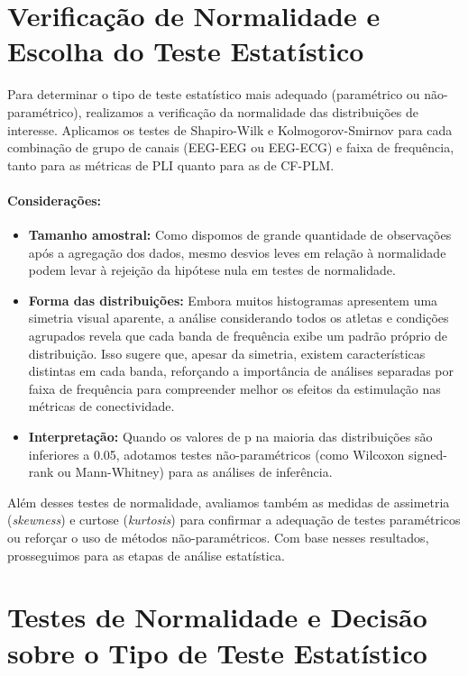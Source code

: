 \section{Verificação de Normalidade e Escolha do Teste Estatístico}

Para determinar o tipo de teste estatístico mais adequado (paramétrico ou não-paramétrico), realizamos a verificação da normalidade das distribuições de interesse. Aplicamos os testes de Shapiro-Wilk e Kolmogorov-Smirnov para cada combinação de grupo de canais (EEG-EEG ou EEG-ECG) e faixa de frequência, tanto para as métricas de PLI quanto para as de CF-PLM.

\paragraph{Considerações:}
\begin{itemize}
    \item \textbf{Tamanho amostral:} Como dispomos de grande quantidade de observações após a agregação dos dados, mesmo desvios leves em relação à normalidade podem levar à rejeição da hipótese nula em testes de normalidade.
    \item \textbf{Forma das distribuições:} Embora muitos histogramas apresentem uma simetria visual aparente, a análise considerando todos os atletas e condições agrupados revela que cada banda de frequência exibe um padrão próprio de distribuição. Isso sugere que, apesar da simetria, existem características distintas em cada banda, reforçando a importância de análises separadas por faixa de frequência para compreender melhor os efeitos da estimulação nas métricas de conectividade.
    \item \textbf{Interpretação:} Quando os valores de p na maioria das distribuições são inferiores a 0.05, adotamos testes não-paramétricos (como Wilcoxon signed-rank ou Mann-Whitney) para as análises de inferência.
\end{itemize}

Além desses testes de normalidade, avaliamos também as medidas de assimetria (\emph{skewness}) e curtose (\emph{kurtosis}) para confirmar a adequação de testes paramétricos ou reforçar o uso de métodos não-paramétricos. Com base nesses resultados, prosseguimos para as etapas de análise estatística.

\section{Testes de Normalidade e Decisão sobre o Tipo de Teste Estatístico}

